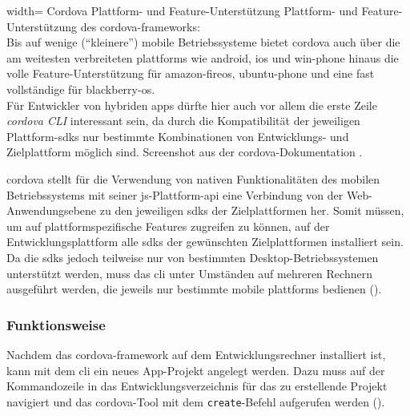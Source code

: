 
	{width=\fullimagesize}
	{Cordova Plattform- und Feature-Unterstützung}
		{Plattform- und Feature-Unterstützung des \gls{cordova}-\glspl{framework}: \\ 
		Bis auf wenige (\enquote{kleinere}) mobile Betriebssysteme bietet \gls{cordova} auch über die am weitesten verbreiteten \glspl{plattform} wie \gls{android}, \gls{ios} und \gls{win-phone} hinaus die volle Feature-Unterstützung für \gls{amazon-fireos}, \gls{ubuntu-phone} und eine fast vollständige für \gls{blackberry-os}.\\
		Für Entwickler von hybriden \glspl{app} dürfte hier auch vor allem die erste Zeile \emph{cordova CLI} interessant sein, da durch die Kompatibilität der jeweiligen Plattform-\glspl{sdk} nur bestimmte Kombinationen von Entwicklungs- und Zielplattform möglich sind.}
	{Screenshot aus der \gls{cordova}-Dokumentation \cite{Cordova-Docs_Platform-Support}.}


\gls{cordova} stellt für die Verwendung von nativen Funktionalitäten des mobilen Betriebssystems mit seiner \gls{js}-Plattform-\gls{api} eine Verbindung von der Web-Anwendungsebene zu den jeweiligen \glspl{sdk} der Zielplattformen her.
Somit müssen, um auf plattformspezifische Features zugreifen zu können, auf der Entwicklungsplattform alle \glspl{sdk} der gewünschten Zielplattformen installiert sein.
Da die \glspl{sdk} jedoch teilweise nur von bestimmten Desktop-Betriebssystemen unterstützt werden, muss das \gls{cli} unter Umständen auf mehreren Rechnern ausgeführt werden, die jeweils nur bestimmte mobile \glspl{plattform} bedienen ().

\subsubsection{Funktionsweise}

Nachdem das \gls{cordova}-\gls{framework} auf dem Entwicklungsrechner installiert ist, kann mit dem \gls{cli} ein neues App-Projekt angelegt werden. 
Dazu muss auf der Kommandozeile in das Entwicklungsverzeichnis für das zu erstellende Projekt navigiert und das \gls{cordova}-Tool mit dem \lstinline|create|-Befehl aufgerufen werden ().

